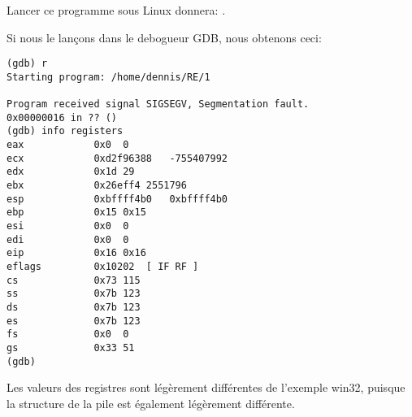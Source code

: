 

Lancer ce programme sous Linux donnera: .


Si nous le lançons dans le debogueur GDB, nous obtenons ceci:

\begin{lstlisting}
(gdb) r
Starting program: /home/dennis/RE/1

Program received signal SIGSEGV, Segmentation fault.
0x00000016 in ?? ()
(gdb) info registers
eax            0x0	0
ecx            0xd2f96388	-755407992
edx            0x1d	29
ebx            0x26eff4	2551796
esp            0xbffff4b0	0xbffff4b0
ebp            0x15	0x15
esi            0x0	0
edi            0x0	0
eip            0x16	0x16
eflags         0x10202	[ IF RF ]
cs             0x73	115
ss             0x7b	123
ds             0x7b	123
es             0x7b	123
fs             0x0	0
gs             0x33	51
(gdb)
\end{lstlisting}

Les valeurs des registres sont légèrement différentes de l'exemple win32, puisque
la structure de la pile est également légèrement différente.
